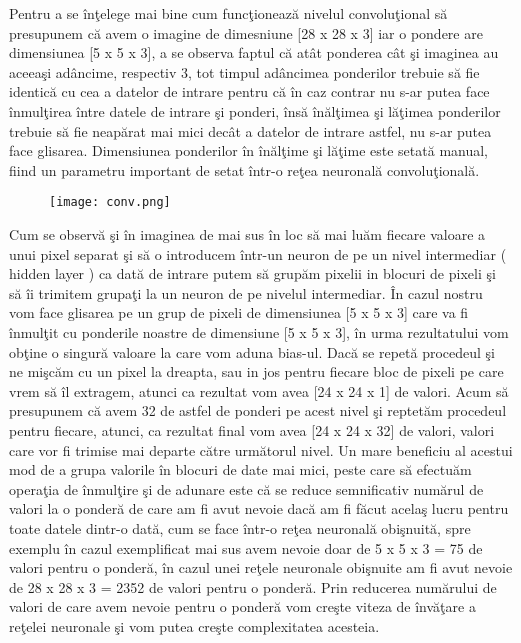 \par

Pentru a se \^{i}n\c{t}elege mai bine cum func\c{t}ioneaz\u{a} nivelul convolu\c{t}ional s\u{a} presupunem c\u{a} avem o imagine de dimesniune [28 x 28 x 3] iar o pondere are dimensiunea [5 x 5 x 3], a se observa faptul c\u{a} at\^{a}t  ponderea c\^{a}t \c{s}i imaginea au aceea\c{s}i ad\^{a}ncime, respectiv 3, tot timpul ad\^{a}ncimea ponderilor trebuie s\u{a} fie identic\u{a} cu cea a datelor de intrare pentru c\u{a} \^{i}n caz contrar nu s-ar putea face \^{i}nmul\c{t}irea \^{i}ntre datele de intrare \c{s}i ponderi, \^{i}ns\u{a} \^{i}n\u{a}l\c{t}imea \c{s}i l\u{a}\c{t}imea ponderilor trebuie s\u{a} fie neap\u{a}rat mai mici dec\^{a}t a datelor de intrare astfel, nu s-ar putea face glisarea. Dimensiunea ponderilor \^{i}n \^{i}n\u{a}l\c{t}ime \c{s}i l\u{a}\c{t}ime este setat\u{a} manual, fiind un parametru important de setat \^{i}ntr-o re\c{t}ea neuronal\u{a} convolu\c{t}ional\u{a}. 

\begin{figure}[h!]
  \centering
  \texttt{[image: conv.png]}
\end{figure}

Cum se observ\u{a} \c{s}i \^{i}n imaginea de mai sus \^{i}n loc s\u{a} mai lu\u{a}m fiecare valoare a unui pixel separat \c{s}i s\u{a} o introducem \^{i}ntr-un neuron de pe un nivel intermediar ( hidden layer ) ca dat\u{a} de intrare putem s\u{a} grup\u{a}m pixelii in blocuri de pixeli \c{s}i s\u{a} \^{i}i trimitem grupa\c{t}i la un neuron de pe nivelul intermediar. \^{I}n cazul nostru vom face glisarea pe un grup de pixeli de dimensiunea [5 x 5 x 3] care va fi \^{i}nmul\c{t}it cu ponderile noastre de dimensiune [5 x 5 x 3], \^{i}n urma rezultatului vom ob\c{t}ine o singur\u{a} valoare la care vom aduna bias-ul. Dac\u{a} se repet\u{a} procedeul  \c{s}i ne mi\c{s}c\u{a}m cu un pixel la dreapta, sau in jos pentru fiecare bloc de pixeli pe care vrem s\u{a} \^{i}l extragem, atunci ca rezultat vom avea [24 x 24 x 1] de valori. Acum s\u{a} presupunem c\u{a} avem 32 de astfel de ponderi pe acest nivel \c{s}i reptet\u{a}m procedeul pentru fiecare, atunci, ca rezultat final vom avea [24 x 24 x 32] de valori, valori care vor fi trimise mai departe c\u{a}tre urm\u{a}torul nivel. Un mare beneficiu al acestui mod de a grupa valorile \^{i}n blocuri de date mai mici, peste care s\u{a} efectu\u{a}m opera\c{t}ia de \^{i}nmul\c{t}ire \c{s}i de adunare este c\u{a} se reduce semnificativ num\u{a}rul de valori la o  ponder\u{a} de care am fi avut nevoie dac\u{a} am fi f\u{a}cut acela\c{s} lucru pentru toate datele dintr-o dat\u{a}, cum se face \^{i}ntr-o re\c{t}ea neuronal\u{a} obi\c{s}nuit\u{a}, spre exemplu \^{i}n cazul exemplificat mai sus avem nevoie doar de 5 x 5 x 3 = 75 de valori pentru o ponder\u{a}, \^{i}n cazul unei re\c{t}ele neuronale obi\c{s}nuite am fi avut nevoie de 28 x 28 x 3 = 2352 de valori pentru o ponder\u{a}. Prin reducerea num\u{a}rului de valori de care avem nevoie pentru o ponder\u{a} vom cre\c{s}te viteza de \^{i}nv\u{a}\c{t}are a re\c{t}elei neuronale \c{s}i vom putea cre\c{s}te complexitatea acesteia.


